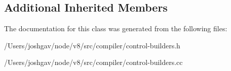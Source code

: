 \subsection*{Additional Inherited Members}


The documentation for this class was generated from the following files\+:\begin{DoxyCompactItemize}
\item 
/\+Users/joshgav/node/v8/src/compiler/control-\/builders.\+h\item 
/\+Users/joshgav/node/v8/src/compiler/control-\/builders.\+cc\end{DoxyCompactItemize}

